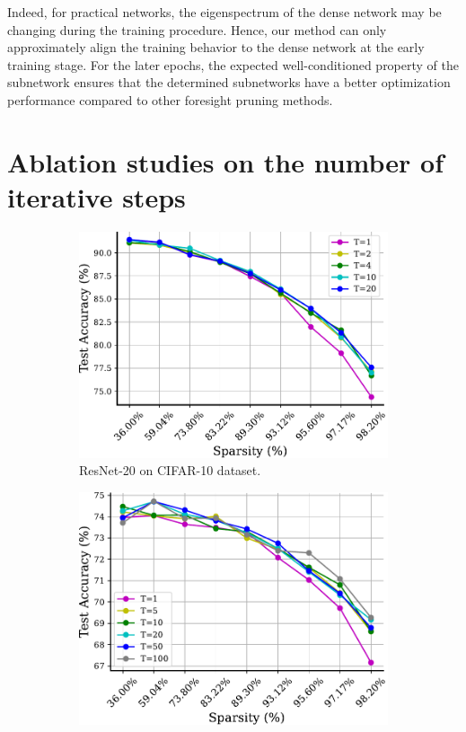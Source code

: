\documentclass{article} %
\begin{document}
Indeed, for practical networks, the eigenspectrum of the dense network may be changing during the training procedure. Hence, our method can only approximately align the training behavior to the dense network at the early training stage. For the later epochs, the expected well-conditioned property of the subnetwork ensures that the determined subnetworks have a better optimization performance compared to other foresight pruning methods.

\section{Ablation studies on the number of iterative steps} \label{sect:appendix-ablation} 
\begin{figure}[h]
    \small
        \centering

        \begin{subfigure}[b]{.5\textwidth}  
            \centering
            \includegraphics[width=.95\linewidth]{plots/test_ablation_cifar10.pdf}%
            \caption%
            {\small ResNet-20 on CIFAR-10 dataset.} 
        \end{subfigure}
        \begin{subfigure}[b]{.480\textwidth}  
            \centering 
            \includegraphics[width=.95\linewidth]{plots/test_ablation_cifar100.pdf} %

\end{subfigure}
\end{figure}
\end{document}
